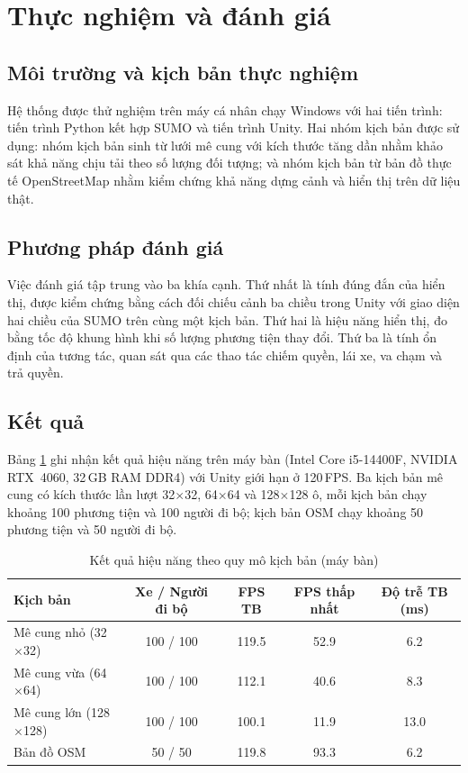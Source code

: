 \documentclass[../DoAn.tex]{subfiles}
\begin{document}
\section{Thực nghiệm và đánh giá}

\subsection{Môi trường và kịch bản thực nghiệm}

Hệ thống được thử nghiệm trên máy cá nhân chạy Windows với hai tiến trình: tiến
trình Python kết hợp \gls{SUMO} và tiến trình Unity. Hai nhóm kịch bản được sử
dụng: nhóm kịch bản sinh từ lưới mê cung với kích thước tăng dần nhằm khảo sát
khả năng chịu tải theo số lượng đối tượng; và nhóm kịch bản từ bản đồ thực tế
OpenStreetMap nhằm kiểm chứng khả năng dựng cảnh và hiển thị trên dữ liệu thật.

\subsection{Phương pháp đánh giá}

Việc đánh giá tập trung vào ba khía cạnh. Thứ nhất là tính đúng đắn của hiển thị,
được kiểm chứng bằng cách đối chiếu cảnh ba chiều trong Unity với giao diện hai
chiều của \gls{SUMO} trên cùng một kịch bản. Thứ hai là hiệu năng hiển thị, đo
bằng tốc độ khung hình khi số lượng phương tiện thay đổi. Thứ ba là tính ổn định
của tương tác, quan sát qua các thao tác chiếm quyền, lái xe, va chạm và trả
quyền.

\subsection{Kết quả}

Bảng \ref{tab:perf} ghi nhận kết quả hiệu năng trên máy bàn (Intel Core i5-14400F,
NVIDIA RTX~4060, 32\,GB RAM DDR4) với Unity giới hạn ở 120\,FPS. Ba kịch bản mê cung có kích thước lần lượt 32$\times$32, 64$\times$64 và 128$\times$128 ô, mỗi kịch bản chạy khoảng 100 phương tiện và 100 người đi bộ;
kịch bản OSM chạy khoảng 50 phương tiện và 50 người đi bộ.

\begin{table}[htbp]
	\centering
	\caption{Kết quả hiệu năng theo quy mô kịch bản (máy bàn)}
	\label{tab:perf}
	\small
	\begin{tabular}{|p{}|c|c|c|c|}
		\hline
		\textbf{Kịch bản} & \textbf{Xe / Người đi bộ} & \textbf{FPS TB} & \textbf{FPS thấp nhất} & \textbf{Độ trễ TB (ms)} \\
		\hline
		Mê cung nhỏ (32$\times$32)    & 100 / 100 & 119.5 & 52.9 & 6.2 \\ \hline
		Mê cung vừa (64$\times$64)    & 100 / 100 & 112.1 & 40.6 & 8.3 \\ \hline
		Mê cung lớn (128$\times$128)  & 100 / 100 & 100.1 & 11.9 & 13.0 \\ \hline
		Bản đồ OSM         & 50 / 50   & 119.8 & 93.3 & 6.2 \\
		\hline
	\end{tabular}
\end{table}
\end{document}

